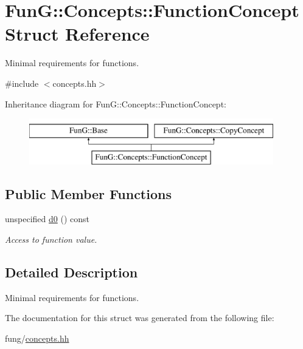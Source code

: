 \hypertarget{structFunG_1_1Concepts_1_1FunctionConcept}{\section{Fun\-G\-:\-:Concepts\-:\-:Function\-Concept Struct Reference}
\label{structFunG_1_1Concepts_1_1FunctionConcept}
}


Minimal requirements for functions.  




{\ttfamily \#include $<$concepts.\-hh$>$}

Inheritance diagram for Fun\-G\-:\-:Concepts\-:\-:Function\-Concept\-:\begin{figure}[H]
\begin{center}
\leavevmode
\includegraphics[height=2.000000cm]{structFunG_1_1Concepts_1_1FunctionConcept}
\end{center}
\end{figure}
\subsection*{Public Member Functions}
\begin{DoxyCompactItemize}
\item 
\hypertarget{structFunG_1_1Concepts_1_1FunctionConcept_a3ced15c8956956bd12c2776fc7c79771}{unspecified \hyperlink{structFunG_1_1Concepts_1_1FunctionConcept_a3ced15c8956956bd12c2776fc7c79771}{d0} () const }\label{structFunG_1_1Concepts_1_1FunctionConcept_a3ced15c8956956bd12c2776fc7c79771}

\begin{DoxyCompactList}\small\item\em Access to function value. \end{DoxyCompactList}\end{DoxyCompactItemize}


\subsection{Detailed Description}
Minimal requirements for functions. 

The documentation for this struct was generated from the following file\-:\begin{DoxyCompactItemize}
\item 
fung/\hyperlink{concepts_8hh}{concepts.\-hh}\end{DoxyCompactItemize}
